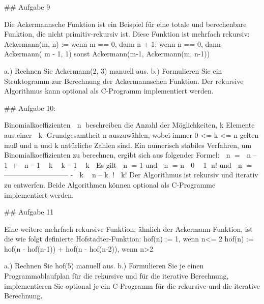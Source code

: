 ## Aufgabe 9

Die Ackermannsche Funktion ist ein Beispiel für eine totale und berechenbare
Funktion, die nicht primitiv-rekursiv ist. Diese Funktion ist mehrfach rekursiv:
Ackermann(m, n) := wenn m == 0, dann n + 1;
wenn n == 0, dann Ackermann( m - 1, 1)
sonst Ackermann(m-1, Ackermann(m, n-1))

a.) Rechnen Sie Ackermann(2, 3) manuell aus.
b.) Formulieren Sie ein Struktogramm zur Berechnung der Ackermannschen Funktion.
Der rekursive Algorithmus kann optional als C-Programm implementiert werden.

## Aufgabe 10:

Binomialkoeffizienten  n beschreiben die Anzahl der Möglichkeiten, k Elemente aus einer
 k
Grundgesamtheit n auszuwählen, wobei immer 0 <= k <= n gelten muß und n und k natürliche
Zahlen sind. Ein numerisch stabiles Verfahren, um Binomialkoeffizienten zu berechnen, ergibt
sich aus folgender Formel:  n
=  n – 1 +  n – 1
 k
 k – 1  k 
Es gilt  n = 1 und  n = n
 0
 1
n!
und  n = ---------------------------
-
 k
 n – k !  k!
Der Algorithmus ist rekursiv und iterativ zu entwerfen. Beide Algorithmen können optional
als C-Programme implementiert werden.

## Aufgabe 11

Eine weitere mehrfach rekursive Funktion, ähnlich der Ackermann-Funktion, ist die wie folgt definierte Hofstadter-Funktion:
hof(n) := 1, wenn n<= 2
hof(n) := hof(n - hof(n-1)) + hof(n - hof(n-2)), wenn n>2

a.) Rechnen Sie hof(5) manuell aus.
b.) Formulieren Sie je einen Programmablaufplan für die rekursive und für die iterative Berechnung, implementieren Sie optional je ein C-Programm für die rekursive und die iterative Berechnung.
